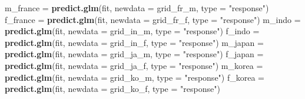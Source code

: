 \documentclass[
]{article}
\newenvironment{Shaded}{\begin{snugshade}}{\end{snugshade}}
\newcommand{\DataTypeTok}[1]{\textcolor[rgb]{0.13,0.29,0.53}{#1}}
\newcommand{\KeywordTok}[1]{\textcolor[rgb]{0.13,0.29,0.53}{\textbf{#1}}}
\newcommand{\NormalTok}[1]{#1}
\newcommand{\StringTok}[1]{\textcolor[rgb]{0.31,0.60,0.02}{#1}}
\begin{document}
\begin{Shaded}
\begin{Highlighting}[]
\NormalTok{m_france =}\StringTok{ }\KeywordTok{predict.glm}\NormalTok{(fit, }\DataTypeTok{newdata =}\NormalTok{ grid_fr_m, }\DataTypeTok{type =} \StringTok{"response"}\NormalTok{)}
\NormalTok{f_france =}\StringTok{ }\KeywordTok{predict.glm}\NormalTok{(fit, }\DataTypeTok{newdata =}\NormalTok{ grid_fr_f, }\DataTypeTok{type =} \StringTok{"response"}\NormalTok{)}
\NormalTok{m_indo =}\StringTok{ }\KeywordTok{predict.glm}\NormalTok{(fit, }\DataTypeTok{newdata =}\NormalTok{ grid_in_m, }\DataTypeTok{type =} \StringTok{"response"}\NormalTok{)}
\NormalTok{f_indo =}\StringTok{ }\KeywordTok{predict.glm}\NormalTok{(fit, }\DataTypeTok{newdata =}\NormalTok{ grid_in_f, }\DataTypeTok{type =} \StringTok{"response"}\NormalTok{)}
\NormalTok{m_japan =}\StringTok{ }\KeywordTok{predict.glm}\NormalTok{(fit, }\DataTypeTok{newdata =}\NormalTok{ grid_ja_m, }\DataTypeTok{type =} \StringTok{"response"}\NormalTok{)}
\NormalTok{f_japan =}\StringTok{ }\KeywordTok{predict.glm}\NormalTok{(fit, }\DataTypeTok{newdata =}\NormalTok{ grid_ja_f, }\DataTypeTok{type =} \StringTok{"response"}\NormalTok{)}
\NormalTok{m_korea =}\StringTok{ }\KeywordTok{predict.glm}\NormalTok{(fit, }\DataTypeTok{newdata =}\NormalTok{ grid_ko_m, }\DataTypeTok{type =} \StringTok{"response"}\NormalTok{)}
\NormalTok{f_korea =}\StringTok{ }\KeywordTok{predict.glm}\NormalTok{(fit, }\DataTypeTok{newdata =}\NormalTok{ grid_ko_f, }\DataTypeTok{type =} \StringTok{"response"}\NormalTok{)}
\end{Highlighting}
\end{Shaded}
\end{document}
